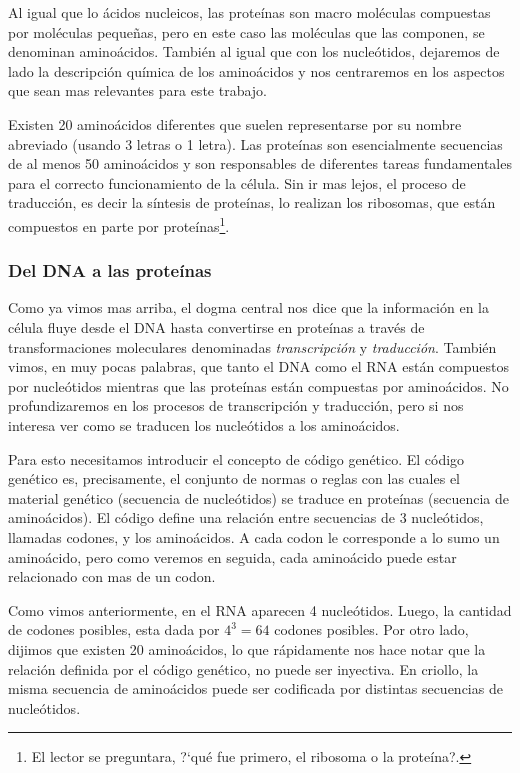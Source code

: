 Al igual que lo \'acidos nucleicos, las prote\'inas son macro mol\'eculas
compuestas por mol\'eculas peque\~nas, pero en este caso las mol\'eculas que
las componen, se denominan amino\'acidos. Tambi\'en al igual que con los
nucle\'otidos, dejaremos de lado la descripci\'on qu\'imica de los
amino\'acidos y nos centraremos en los aspectos que sean mas relevantes para
este trabajo.

Existen 20 amino\'acidos diferentes que suelen representarse por su
nombre abreviado (usando 3 letras o 1 letra). Las prote\'inas son esencialmente
secuencias de al menos 50 amino\'acidos y son responsables de diferentes tareas
fundamentales para el correcto funcionamiento de la c\'elula. Sin ir mas lejos,
el proceso de traducci\'on, es decir la s\'intesis de prote\'inas, lo realizan
los ribosomas, que est\'an compuestos en parte por prote\'inas\footnote{El
lector se preguntara, ?`qu\'e fue primero, el ribosoma o la prote\'ina?.}.

\subsubsection{Del \ac{DNA} a las prote\'inas}

Como ya vimos mas arriba, el dogma central nos dice que la informaci\'on en la
c\'elula fluye desde el \ac{DNA} hasta convertirse en prote\'inas a trav\'es de
transformaciones moleculares denominadas \textit{transcripci\'on} y
\textit{traducci\'on}. Tambi\'en vimos, en muy pocas palabras, que tanto el
\ac{DNA} como el \ac{RNA} est\'an compuestos por nucle\'otidos mientras que las
prote\'inas est\'an compuestas por amino\'acidos. No profundizaremos en los
procesos de transcripci\'on y traducci\'on, pero si nos interesa ver como se
traducen los nucle\'otidos a los amino\'acidos.

Para esto necesitamos introducir el concepto de c\'odigo gen\'etico. El
c\'odigo gen\'etico es, precisamente, el conjunto de normas o reglas con las
cuales el material gen\'etico (secuencia de nucle\'otidos) se traduce en
prote\'inas (secuencia de amino\'acidos). El c\'odigo define una relaci\'on
entre secuencias de 3 nucle\'otidos, llamadas codones, y los amino\'acidos. A
cada codon le corresponde a lo sumo un amino\'acido, pero como veremos en
seguida, cada amino\'acido puede estar relacionado con mas de un codon.

Como vimos anteriormente, en el \ac{RNA} aparecen 4 nucle\'otidos. Luego,
la cantidad de codones posibles, esta dada por $4^{3} = 64$ codones
posibles. Por otro lado, dijimos que existen 20 amino\'acidos, lo que
r\'apidamente nos hace notar que la relaci\'on definida por el c\'odigo
gen\'etico, no puede ser inyectiva. En criollo, la misma secuencia de
amino\'acidos puede ser codificada por distintas secuencias de
nucle\'otidos.

